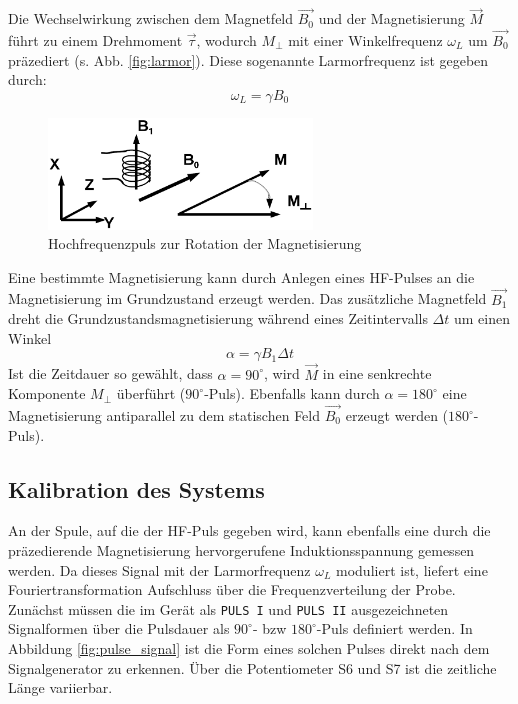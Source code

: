 \documentclass[a4paper]{scrartcl} %
\begin{document}
Die Wechselwirkung zwischen dem Magnetfeld $\vec{B_0}$ und der Magnetisierung $\vec{M}$ führt zu einem Drehmoment $\vec{\tau}$, wodurch $M_{\perp}$ mit einer Winkelfrequenz $\omega_{L}$ um $\vec{B_0}$ präzediert (s. Abb. \ref{fig:larmor}). Diese sogenannte Larmorfrequenz ist gegeben durch:
\begin{equation}
\omega_{L} = \gamma B_0
\label{eq:larmor_freq}
\end{equation}
\begin{figure}[H]
	\centering
	\includegraphics[width=70mm]{./Resources/hf_pulse.png}
	\caption{Hochfrequenzpuls zur Rotation der Magnetisierung}
\end{figure}
Eine bestimmte Magnetisierung kann durch Anlegen eines HF-Pulses an die Magnetisierung im Grundzustand erzeugt werden. Das zusätzliche Magnetfeld $\vec{B_1}$ dreht die Grundzustandsmagnetisierung während eines Zeitintervalls $\Delta t$ um einen Winkel
\begin{equation}
\alpha = \gamma B_1 \Delta t
\end{equation}
Ist die Zeitdauer so gewählt, dass $\alpha = 90^\circ$, wird $\vec{M}$ in eine senkrechte Komponente $M_{\perp}$ überführt ($90^\circ$-Puls). Ebenfalls kann durch $\alpha = 180^\circ$ eine Magnetisierung antiparallel zu dem statischen Feld $\vec{B_0}$ erzeugt werden ($180^\circ$-Puls).

\subsection{Kalibration des Systems}

An der Spule, auf die der HF-Puls gegeben wird, kann ebenfalls eine durch die präzedierende Magnetisierung hervorgerufene Induktionsspannung gemessen werden. Da dieses Signal mit der Larmorfrequenz $\omega_L$ moduliert ist, liefert eine Fouriertransformation Aufschluss über die Frequenzverteilung der Probe.
\newline\newline
Zunächst müssen die im Gerät als \texttt{PULS I} und \texttt{PULS II} ausgezeichneten Signalformen über die Pulsdauer als $90^\circ$- bzw $180^\circ$-Puls definiert werden. In Abbildung \ref{fig:pulse_signal} ist die Form eines solchen Pulses direkt nach dem Signalgenerator zu erkennen. Über die Potentiometer S6 und S7 ist die zeitliche Länge variierbar.
\end{document}
